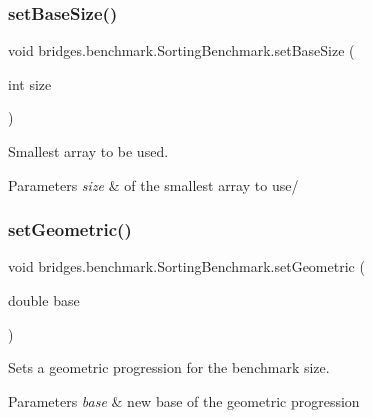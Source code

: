 \subsubsection{\texorpdfstring{set\+Base\+Size()}{setBaseSize()}}
{\footnotesize\ttfamily void bridges.\+benchmark.\+Sorting\+Benchmark.\+set\+Base\+Size (\begin{DoxyParamCaption}\item[{int}]{size }\end{DoxyParamCaption})}



Smallest array to be used. 


\begin{DoxyParams}{Parameters}
{\em size} & of the smallest array to use/ \\
\hline
\end{DoxyParams}
\mbox{\label{classbridges_1_1benchmark_1_1_sorting_benchmark_ab6871c77ec75cc58225497a8a9f45a90}} 
\subsubsection{\texorpdfstring{set\+Geometric()}{setGeometric()}}
{\footnotesize\ttfamily void bridges.\+benchmark.\+Sorting\+Benchmark.\+set\+Geometric (\begin{DoxyParamCaption}\item[{double}]{base }\end{DoxyParamCaption})}



Sets a geometric progression for the benchmark size. 


\begin{DoxyParams}{Parameters}
{\em base} & new base of the geometric progression \\
\hline
\end{DoxyParams}
\mbox{\label{classbridges_1_1benchmark_1_1_sorting_benchmark_a1a44c5c6d5db47a26c6a801d71d85b58}} 
